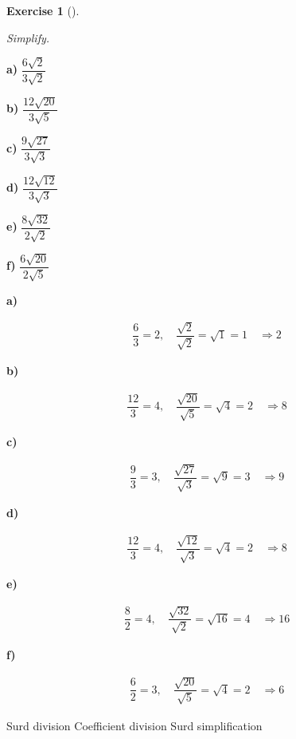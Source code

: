 \documentclass[
  letterpaper,
  DIV=11,
  numbers=noendperiod]{scrreprt}
\theoremstyle{definition}
\newtheorem{exercise}{Exercise}[chapter]
\theoremstyle{remark}
\begin{document}
\begin{exercise}[]\protect\hypertarget{exr-u2-39}{}\label{exr-u2-39}

\emph{Simplify.}

\textbf{a)} \(\displaystyle \dfrac{6\sqrt{2}}{3\sqrt{2}}\)

\textbf{b)} \(\displaystyle \dfrac{12\sqrt{20}}{3\sqrt{5}}\)

\textbf{c)} \(\displaystyle \dfrac{9\sqrt{27}}{3\sqrt{3}}\)

\textbf{d)} \(\displaystyle \dfrac{12\sqrt{12}}{3\sqrt{3}}\)

\textbf{e)} \(\displaystyle \dfrac{8\sqrt{32}}{2\sqrt{2}}\)

\textbf{f)} \(\displaystyle \dfrac{6\sqrt{20}}{2\sqrt{5}}\)

\begin{tcolorbox}[enhanced jigsaw, opacitybacktitle=0.6, coltitle=black, arc=.35mm, colframe=quarto-callout-tip-color-frame, colback=white, bottomrule=.15mm, left=2mm, colbacktitle=quarto-callout-tip-color!10!white, titlerule=0mm, opacityback=0, title=\textcolor{quarto-callout-tip-color}{\faLightbulb}\hspace{0.5em}{🔍 View Solutions}, leftrule=.75mm, breakable, rightrule=.15mm, bottomtitle=1mm, toptitle=1mm, toprule=.15mm]

\textbf{a)}

\[
\begin{aligned}
\dfrac{6}{3}=2,\quad\dfrac{\sqrt{2}}{\sqrt{2}}=\sqrt{1}=1\quad\Rightarrow2
\end{aligned}
\]

\textbf{b)}

\[
\begin{aligned}
\dfrac{12}{3}=4,\quad\dfrac{\sqrt{20}}{\sqrt{5}}=\sqrt{4}=2\quad\Rightarrow8
\end{aligned}
\]

\textbf{c)}

\[
\begin{aligned}
\dfrac{9}{3}=3,\quad\dfrac{\sqrt{27}}{\sqrt{3}}=\sqrt{9}=3\quad\Rightarrow9
\end{aligned}
\]

\textbf{d)}

\[
\begin{aligned}
\dfrac{12}{3}=4,\quad\dfrac{\sqrt{12}}{\sqrt{3}}=\sqrt{4}=2\quad\Rightarrow8
\end{aligned}
\]

\textbf{e)}

\[
\begin{aligned}
\dfrac{8}{2}=4,\quad\dfrac{\sqrt{32}}{\sqrt{2}}=\sqrt{16}=4\quad\Rightarrow16
\end{aligned}
\]

\textbf{f)}

\[
\begin{aligned}
\dfrac{6}{2}=3,\quad\dfrac{\sqrt{20}}{\sqrt{5}}=\sqrt{4}=2\quad\Rightarrow6
\end{aligned}
\]

\end{tcolorbox}

{Surd division} {Coefficient division} {Surd simplification}

\end{exercise}
\end{document}
